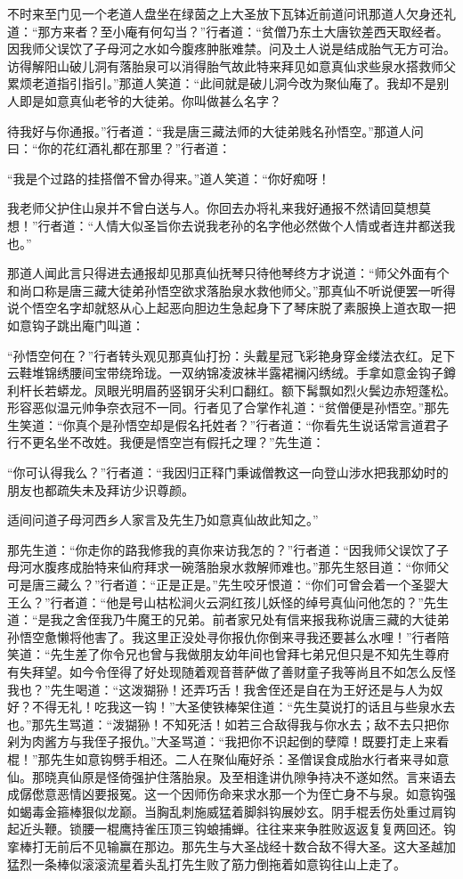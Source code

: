 \documentclass[12pt,UTF8]{ctexbook}
\begin{document}
{不时来至门见一个老道人盘坐在绿茵之上大圣放下瓦钵近前道问讯那道人欠身还礼道：“那方来者？至小庵有何勾当？”行者道：“贫僧乃东土大唐钦差西天取经者。因我师父误饮了子母河之水如今腹疼肿胀难禁。问及土人说是结成胎气无方可治。访得解阳山破儿洞有落胎泉可以消得胎气故此特来拜见如意真仙求些泉水搭救师父累烦老道指引指引。”那道人笑道：“此间就是破儿洞今改为聚仙庵了。我却不是别人即是如意真仙老爷的大徒弟。你叫做甚么名字？

待我好与你通报。”行者道：“我是唐三藏法师的大徒弟贱名孙悟空。”那道人问曰：“你的花红酒礼都在那里？”行者道：

“我是个过路的挂搭僧不曾办得来。”道人笑道：“你好痴呀！

我老师父护住山泉并不曾白送与人。你回去办将礼来我好通报不然请回莫想莫想！”行者道：“人情大似圣旨你去说我老孙的名字他必然做个人情或者连井都送我也。”

那道人闻此言只得进去通报却见那真仙抚琴只待他琴终方才说道：“师父外面有个和尚口称是唐三藏大徒弟孙悟空欲求落胎泉水救他师父。”那真仙不听说便罢一听得说个悟空名字却就怒从心上起恶向胆边生急起身下了琴床脱了素服换上道衣取一把如意钩子跳出庵门叫道：

“孙悟空何在？”行者转头观见那真仙打扮：头戴星冠飞彩艳身穿金缕法衣红。足下云鞋堆锦绣腰间宝带绕玲珑。一双纳锦凌波袜半露裙襕闪绣绒。手拿如意金钩子鐏利杆长若蟒龙。凤眼光明眉菂竖钢牙尖利口翻红。额下髯飘如烈火鬓边赤短蓬松。形容恶似温元帅争奈衣冠不一同。行者见了合掌作礼道：“贫僧便是孙悟空。”那先生笑道：“你真个是孙悟空却是假名托姓者？”行者道：“你看先生说话常言道君子行不更名坐不改姓。我便是悟空岂有假托之理？”先生道：

“你可认得我么？”行者道：“我因归正释门秉诚僧教这一向登山涉水把我那幼时的朋友也都疏失未及拜访少识尊颜。

适间问道子母河西乡人家言及先生乃如意真仙故此知之。”

那先生道：“你走你的路我修我的真你来访我怎的？”行者道：“因我师父误饮了子母河水腹疼成胎特来仙府拜求一碗落胎泉水救解师难也。”那先生怒目道：“你师父可是唐三藏么？”行者道：“正是正是。”先生咬牙恨道：“你们可曾会着一个圣婴大王么？”行者道：“他是号山枯松涧火云洞红孩儿妖怪的绰号真仙问他怎的？”先生道：“是我之舍侄我乃牛魔王的兄弟。前者家兄处有信来报我称说唐三藏的大徒弟孙悟空惫懒将他害了。我这里正没处寻你报仇你倒来寻我还要甚么水哩！”行者陪笑道：“先生差了你令兄也曾与我做朋友幼年间也曾拜七弟兄但只是不知先生尊府有失拜望。如今令侄得了好处现随着观音菩萨做了善财童子我等尚且不如怎么反怪我也？”先生喝道：“这泼猢狲！还弄巧舌！我舍侄还是自在为王好还是与人为奴好？不得无礼！吃我这一钩！”大圣使铁棒架住道：“先生莫说打的话且与些泉水去也。”那先生骂道：“泼猢狲！不知死活！如若三合敌得我与你水去；敌不去只把你剁为肉酱方与我侄子报仇。”大圣骂道：“我把你不识起倒的孽障！既要打走上来看棍！”那先生如意钩劈手相还。二人在聚仙庵好杀：圣僧误食成胎水行者来寻如意仙。那晓真仙原是怪倚强护住落胎泉。及至相逢讲仇隙争持决不遂如然。言来语去成僝僽意恶情凶要报冤。这一个因师伤命来求水那一个为侄亡身不与泉。如意钩强如蝎毒金箍棒狠似龙巅。当胸乱刺施威猛着脚斜钩展妙玄。阴手棍丢伤处重过肩钩起近头鞭。锁腰一棍鹰持雀压顶三钩蜋捕蝉。往往来来争胜败返返复复两回还。钩挛棒打无前后不见输赢在那边。那先生与大圣战经十数合敌不得大圣。这大圣越加猛烈一条棒似滚滚流星着头乱打先生败了筋力倒拖着如意钩往山上走了。

}
\end{document}
